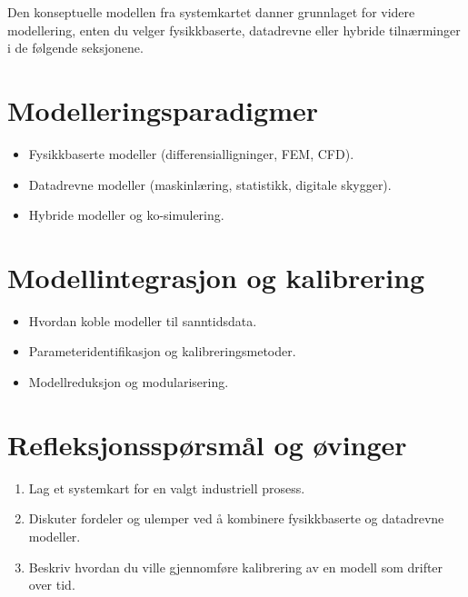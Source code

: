 Den konseptuelle modellen fra systemkartet danner grunnlaget for videre modellering, enten du velger fysikkbaserte, datadrevne eller hybride tilnærminger i de følgende seksjonene.

\section{Modelleringsparadigmer}
\begin{itemize}
    \item Fysikkbaserte modeller (differensialligninger, FEM, CFD).
    \item Datadrevne modeller (maskinlæring, statistikk, digitale skygger).
    \item Hybride modeller og ko-simulering.
\end{itemize}

\section{Modellintegrasjon og kalibrering}
\begin{itemize}
    \item Hvordan koble modeller til sanntidsdata.
    \item Parameteridentifikasjon og kalibreringsmetoder.
    \item Modellreduksjon og modularisering.
\end{itemize}

\section{Refleksjonsspørsmål og øvinger}
\begin{enumerate}
    \item Lag et systemkart for en valgt industriell prosess.
    \item Diskuter fordeler og ulemper ved å kombinere fysikkbaserte og datadrevne modeller.
    \item Beskriv hvordan du ville gjennomføre kalibrering av en modell som drifter over tid.
\end{enumerate}
